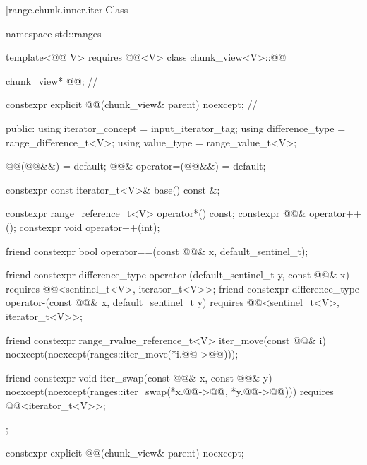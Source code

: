[range.chunk.inner.iter]{Class }

%
\begin{codeblock}
namespace std::ranges {
  template<@@ V>
    requires @@<V>
  class chunk_view<V>::@@ {
    chunk_view* @@;                                                // \expos

    constexpr explicit @@(chunk_view& parent) noexcept;     // \expos

  public:
    using iterator_concept = input_iterator_tag;
    using difference_type = range_difference_t<V>;
    using value_type = range_value_t<V>;

    @@(@@&&) = default;
    @@& operator=(@@&&) = default;

    constexpr const iterator_t<V>& base() const &;

    constexpr range_reference_t<V> operator*() const;
    constexpr @@& operator++();
    constexpr void operator++(int);

    friend constexpr bool operator==(const @@& x, default_sentinel_t);

    friend constexpr difference_type operator-(default_sentinel_t y, const @@& x)
      requires @@<sentinel_t<V>, iterator_t<V>>;
    friend constexpr difference_type operator-(const @@& x, default_sentinel_t y)
      requires @@<sentinel_t<V>, iterator_t<V>>;

    friend constexpr range_rvalue_reference_t<V> iter_move(const @@& i)
      noexcept(noexcept(ranges::iter_move(*i.@@->@@)));

    friend constexpr void iter_swap(const @@& x, const @@& y)
      noexcept(noexcept(ranges::iter_swap(*x.@@->@@, *y.@@->@@)))
      requires @@<iterator_t<V>>;
  };
}
\end{codeblock}

%
\begin{itemdecl}
constexpr explicit @@(chunk_view& parent) noexcept;
\end{itemdecl}


